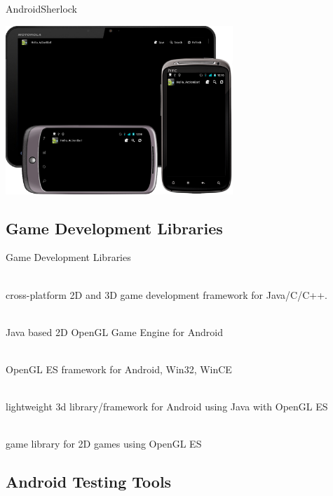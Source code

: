 \documentclass[aspectratio=169]{beamer}
\newcommand{\surl}[1] {{\tiny \url{#1}}}
\begin{document}
    \begin{frame}{AndroidSherlock}
      \begin{center}
      \includegraphics[height=2.5in]{androidsherlock.png}
      \end{center}
    \end{frame}

\subsection{Game Development Libraries}

    \begin{frame}{Game Development Libraries}
      \begin{description}
        \item<1->[libgdx \surl{http://libgdx.badlogicgames.com/}] \hfill \\ cross-platform 2D and 3D game development framework for Java/C/C++. 
        \item<2->[AndEngine \surl{http://www.andengine.org/}] \hfill \\ Java based 2D OpenGL Game Engine for Android
        \item<3->[forget3D \surl{http://code.google.com/p/forget3d/}] \hfill \\ OpenGL ES framework for Android, Win32, WinCE
        \item<4->[min3d \surl{http://code.google.com/p/min3d/}] \hfill \\ lightweight 3d library/framework for Android using Java with OpenGL ES 
        \item<5->[Angle  \surl{http://code.google.com/p/angle/}] \hfill \\ game library for 2D games using OpenGL ES
      \end{description}
    \end{frame}

  \subsection{Android Testing Tools}
\end{document}
